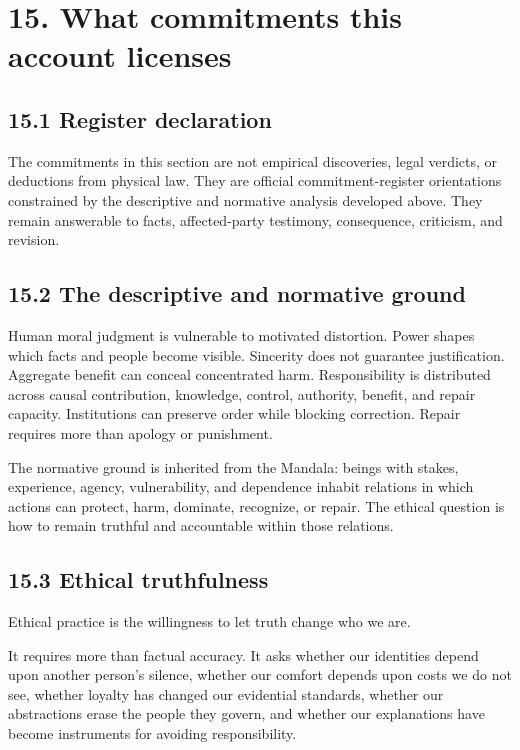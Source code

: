 \documentclass[
  11pt,
]{article}
\begin{document}
\section{15. What commitments this account
licenses}\label{what-commitments-this-account-licenses}

\subsection{15.1 Register declaration}\label{register-declaration}

The commitments in this section are not empirical discoveries, legal
verdicts, or deductions from physical law. They are official
commitment-register orientations constrained by the descriptive and
normative analysis developed above. They remain answerable to facts,
affected-party testimony, consequence, criticism, and revision.

\subsection{15.2 The descriptive and normative
ground}\label{the-descriptive-and-normative-ground}

Human moral judgment is vulnerable to motivated distortion. Power shapes
which facts and people become visible. Sincerity does not guarantee
justification. Aggregate benefit can conceal concentrated harm.
Responsibility is distributed across causal contribution, knowledge,
control, authority, benefit, and repair capacity. Institutions can
preserve order while blocking correction. Repair requires more than
apology or punishment.

The normative ground is inherited from the Mandala: beings with stakes,
experience, agency, vulnerability, and dependence inhabit relations in
which actions can protect, harm, dominate, recognize, or repair. The
ethical question is how to remain truthful and accountable within those
relations.

\subsection{15.3 Ethical truthfulness}\label{ethical-truthfulness}

Ethical practice is the willingness to let truth change who we are.

It requires more than factual accuracy. It asks whether our identities
depend upon another person's silence, whether our comfort depends upon
costs we do not see, whether loyalty has changed our evidential
standards, whether our abstractions erase the people they govern, and
whether our explanations have become instruments for avoiding
responsibility.
\end{document}
